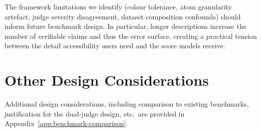 The framework limitations we identify (colour tolerance, atom granularity artefact, judge severity disagreement, dataset composition confounds) should inform future benchmark design.
In particular, longer descriptions increase the number of verifiable claims and thus the error surface, creating a practical tension between the detail accessibility users need and the score models receive.

\section{Other Design Considerations}\label{sec:disc-design}

Additional design considerations, including comparison to existing benchmarks, justification for the dual-judge design, etc.\ are provided in Appendix~\ref{app:benchmark-comparison}.
